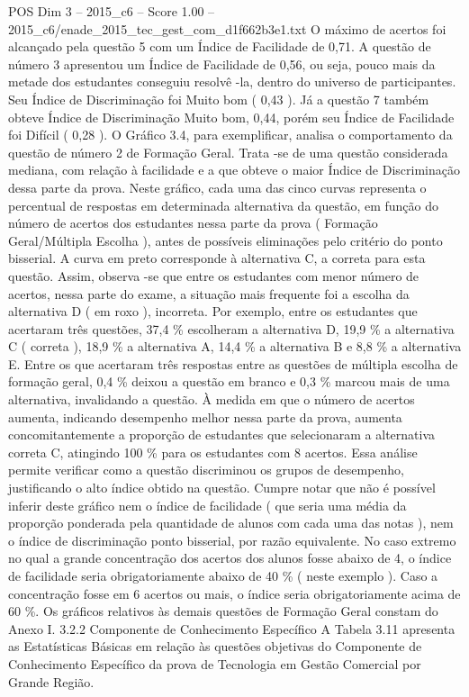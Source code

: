 \begin{textsample}{POS Dim 3 – 2015\_c6 – Score 1.00 – 2015\_c6/enade\_2015\_tec\_gest\_com\_d1f662b3e1.txt}
O máximo de acertos foi alcançado pela questão 5 com um Índice de Facilidade de 0,71.
A questão de número 3 apresentou um Índice de Facilidade de 0,56, ou seja, pouco mais da metade dos estudantes conseguiu resolvê -la, dentro do universo de participantes.
Seu Índice de Discriminação foi Muito bom ( 0,43 ).
Já a questão 7 também obteve Índice de Discriminação Muito bom, 0,44, porém seu Índice de Facilidade foi Difícil ( 0,28 ).
O Gráfico 3.4, para exemplificar, analisa o comportamento da questão de número 2 de Formação Geral.
Trata -se de uma questão considerada mediana, com relação à facilidade e a que obteve o maior Índice de Discriminação dessa parte da prova.
Neste gráfico, cada uma das cinco curvas representa o percentual de respostas em determinada alternativa da questão, em função do número de acertos dos estudantes nessa parte da prova ( Formação Geral/Múltipla Escolha ), antes de possíveis eliminações pelo critério do ponto bisserial.
A curva em preto corresponde à alternativa C, a correta para esta questão.
Assim, observa -se que entre os estudantes com menor número de acertos, nessa parte do exame, a situação mais frequente foi a escolha da alternativa D ( em roxo ), incorreta.
Por exemplo, entre os estudantes que acertaram três questões, 37,4 \% escolheram a alternativa D, 19,9 \% a alternativa C ( correta ), 18,9 \% a alternativa A, 14,4 \% a alternativa B e 8,8 \% a alternativa E.
Entre os que acertaram três respostas entre as questões de múltipla escolha de formação geral, 0,4 \% deixou a questão em branco e 0,3 \% marcou mais de uma alternativa, invalidando a questão.
À medida em que o número de acertos aumenta, indicando desempenho melhor nessa parte da prova, aumenta concomitantemente a proporção de estudantes que selecionaram a alternativa correta C, atingindo 100 \% para os estudantes com 8 acertos.
Essa análise permite verificar como a questão discriminou os grupos de desempenho, justificando o alto índice obtido na questão.
Cumpre notar que não é possível inferir deste gráfico nem o índice de facilidade ( que seria uma média da proporção ponderada pela quantidade de alunos com cada uma das notas ), nem o índice de discriminação ponto bisserial, por razão equivalente.
No caso extremo no qual a grande concentração dos acertos dos alunos fosse abaixo de 4, o índice de facilidade seria obrigatoriamente abaixo de 40 \% ( neste exemplo ).
Caso a concentração fosse em 6 acertos ou mais, o índice seria obrigatoriamente acima de 60 \%.
Os gráficos relativos às demais questões de Formação Geral constam do Anexo I. 3.2.2 Componente de Conhecimento Específico A Tabela 3.11 apresenta as Estatísticas Básicas em relação às questões objetivas do Componente de Conhecimento Específico da prova de Tecnologia em Gestão Comercial por Grande Região.

\end{textsample}
